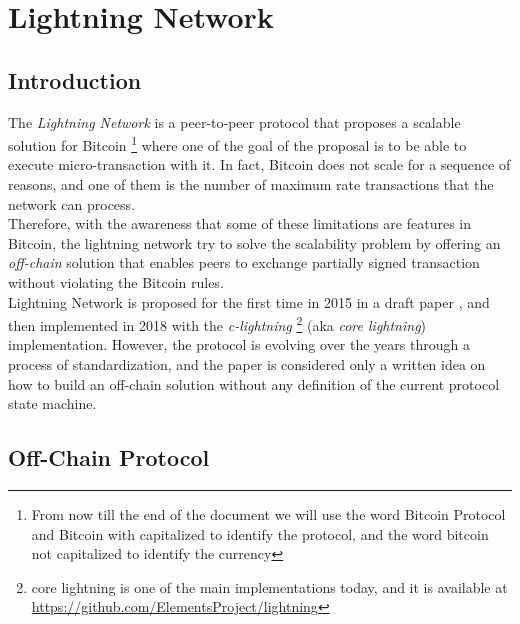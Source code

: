 \setcounter{page}{1}

\chapter{Lightning Network}
\label{sec:lightning_network}

\newcommand{\noteOnBitcoinNaming}[0]{
    \footnote{
        From now till the end of the document we will use the word Bitcoin Protocol and
        Bitcoin with capitalized to identify the protocol, and the word bitcoin not capitalized to identify the currency
    }
}

\newcommand{\noteOnCLNImpl}[0]{
    \footnote{
    core lightning is one of the main implementations today, and it is available at
    \href{https://github.com/ElementsProject/lightning}{https://github.com/ElementsProject/lightning}
    }
}



\section{Introduction}

The \emph{Lightning Network} is a peer-to-peer protocol that proposes a scalable solution for Bitcoin\noteOnBitcoinNaming where one
of the goal of the proposal is to be able to execute micro-transaction with it.
In fact, Bitcoin does not scale for a sequence of reasons, and one of them is the number of
maximum rate transactions that the network can process.\\
Therefore, with the awareness that some of these limitations are features in Bitcoin, the lightning network try to solve
the scalability problem by offering an \emph{off-chain} solution that enables peers to exchange partially
signed transaction without violating the Bitcoin rules.\\
Lightning Network is proposed for the first time in 2015 in a draft paper \cite{lightning-network-paper},
and then implemented in 2018 with the \emph{c-lightning}\noteOnCLNImpl (aka \emph{core lightning}) implementation.
However, the protocol is evolving over the years through a process of standardization\cite{lightning-bolts}, and the paper is considered
only a written idea on how to build an off-chain solution without any definition of the current protocol state machine.

\section{Off-Chain Protocol}

